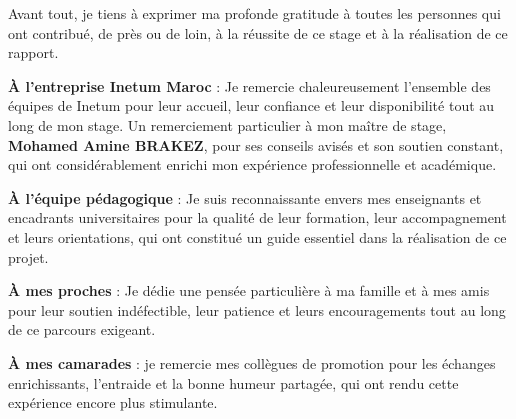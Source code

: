\remerciements

Avant tout, je tiens à exprimer ma profonde gratitude à toutes les personnes qui ont
contribué, de près ou de loin, à la réussite de ce stage et à la réalisation de ce rapport.

\medskip

\textbf{À l'entreprise Inetum Maroc} :
Je remercie chaleureusement l'ensemble des équipes de Inetum pour leur accueil,
leur confiance et leur disponibilité tout au long de mon stage. Un remerciement particulier
à mon maître de stage, \textbf{Mohamed Amine BRAKEZ}, pour ses conseils avisés et son soutien
constant, qui ont considérablement enrichi mon expérience professionnelle et académique.

\medskip

\textbf{À l'équipe pédagogique} :
Je suis reconnaissante envers mes enseignants et encadrants universitaires pour la qualité
de leur formation, leur accompagnement et leurs orientations, qui ont constitué un guide
essentiel dans la réalisation de ce projet.

\medskip

\textbf{À mes proches} :
Je dédie une pensée particulière à ma famille et à mes amis pour leur soutien indéfectible,
leur patience et leurs encouragements tout au long de ce parcours exigeant.

\medskip

\textbf{À mes camarades} :
je remercie mes collègues de promotion pour les échanges enrichissants, l'entraide
et la bonne humeur partagée, qui ont rendu cette expérience encore plus stimulante.